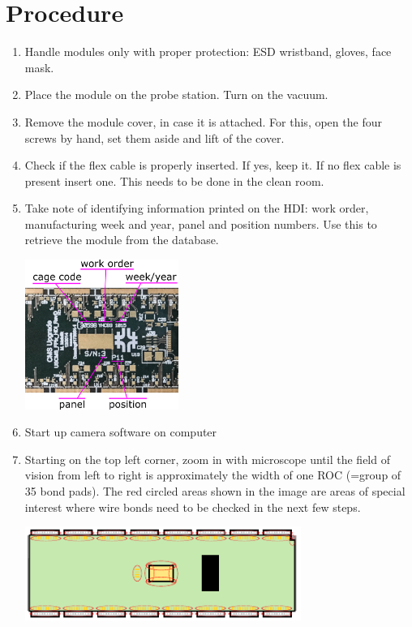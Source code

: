 \documentclass[12pt]{unlsilabsop}
\begin{document}
\section{Procedure}

\begin{enumerate}
    \item Handle modules only with proper protection: ESD wristband, gloves, face mask.
    \item Place the module on the probe station. Turn on the vacuum.
    \item Remove the module cover, in case it is attached. For this, open the four screws by hand, set them aside and lift of the cover.
    \item Check if the flex cable is properly inserted. If yes, keep it. If no flex cable is present insert one. This needs to be done in the clean room.
    \item Take note of identifying information printed on the HDI: work order, manufacturing week and year, panel and position numbers. Use this to retrieve the module from the database.

    \begin{center}
        \includegraphics[width=5cm]{img/HDIRevD_id.png}
    \end{center}

    \item Start up camera software on computer
    \item Starting on the top left corner, zoom in with microscope until the field of vision from left to right is approximately the width of one ROC (=group of 35 bond pads). The red circled areas shown in the image are areas of special interest where wire bonds need to be checked in the next few steps.

    \begin{center}
        \includegraphics[width=9cm]{img/ModuleSchematicInpsection.pdf}
    \end{center}


\end{enumerate}
\end{document}
